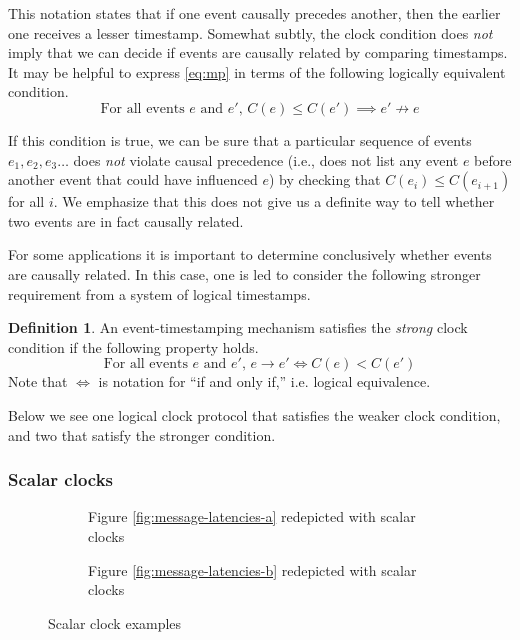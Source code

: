 \documentclass[]             %
{NASA}                       %
\theoremstyle{definition}
\newtheorem{definition}[theorem]{Definition}
\begin{document}
This notation states that if one event causally precedes another, then
the earlier one receives a lesser timestamp. Somewhat subtly, the
clock condition does \emph{not} imply that we can decide if events are
causally related by comparing timestamps. It may be helpful to express
\eqref{eq:mp} in terms of the following logically equivalent
condition.
\[ \textrm{For all events $e$ and $e'$, }C(e) \leq C(e') \implies e'
  \not\to e \label{eq:mp-conv}\tag{CC$'$} \]

If this condition is true, we can be sure that a particular sequence
of events $e_1, e_2, e_3\ldots$ does \emph{not} violate causal
precedence (i.e., does not list any event $e$ before another event
that could have influenced $e$) by checking that
$C(e_{i}) \leq C(e_{i+1})$ for all $i$. We emphasize that this does
not give us a definite way to tell whether two events are in fact
causally related.

For some applications it is important to determine conclusively
whether events are causally related. In this case, one is led to
consider the following stronger requirement from a system of logical
timestamps.
\begin{definition}
  An event-timestamping mechanism satisfies the \emph{strong} clock   condition if the following property holds.
  \[ \textrm{For all events $e$ and $e'$, } e \to e' \iff C(e) < C(e') \label{eq:sc}\tag{SC} \]
  Note that $\iff$ is notation for ``if and only if,'' i.e. logical equivalence.
\end{definition}
Below we see one logical clock protocol that satisfies the weaker
clock condition, and two that satisfy the stronger condition.

\subsubsection{Scalar clocks}
\label{sssec:scalar-clocks}
\begin{figure}
  \setlength\belowcaptionskip{5ex}

  \begin{subfigure}{1\textwidth}
    \centering 
    \caption{Figure \ref{fig:message-latencies-a} redepicted with scalar clocks}
    \label{fig:message-latencies-scalar-a}
  \end{subfigure}

  \begin{subfigure}{1\textwidth}
    \centering 
    \caption{Figure \ref{fig:message-latencies-b} redepicted with scalar clocks}
    \label{fig:message-latencies-scalar-b}
  \end{subfigure}

  \caption{Scalar clock examples}
  \label{fig:message-latencies-scalar}
\end{figure}
\end{document}
